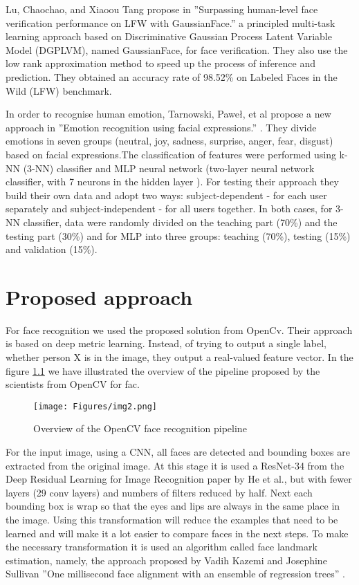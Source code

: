 \documentclass[runningheads,a4paper,11pt]{report}
\begin{document}
Lu, Chaochao, and Xiaoou Tang 	propose in ''Surpassing human-level face verification performance on LFW with GaussianFace.'' \cite{lu2015surpassing}  a principled multi-task learning approach based on Discriminative Gaussian Process Latent Variable Model (DGPLVM), named GaussianFace, for face verification. They also use the low rank approximation method to speed up the process of inference and prediction. They obtained an accuracy rate of 98.52\% on  Labeled Faces in the Wild (LFW) benchmark.

In order to recognise human emotion,  Tarnowski, Paweł, et al propose a new approach in ''Emotion recognition using facial expressions.'' \cite{tarnowski2017emotion} . They divide emotions in seven groups  (neutral, joy, sadness, surprise, anger, fear, disgust) based on facial expressions.The classification of features were performed using k-NN (3-NN) classifier and MLP neural network (two-layer neural network classifier, with 7 neurons in the hidden layer ). For testing their approach they build their own data and adopt two ways:  subject-dependent - for each user separately and  subject-independent - for all users together. In both cases, for 3-NN classifier, data were randomly divided on the teaching part (70\%) and the testing part (30\%) and for MLP into three groups: teaching (70\%), testing (15\%) and validation (15\%).


\chapter{Proposed approach}
\label{chapter:proposedApproach}

For face recognition we used the proposed solution from OpenCv. Their approach is based on deep metric learning. Instead, of trying to output a single label, whether person X is in the image, they output a real-valued feature vector. In the figure \ref{img2} we have illustrated the overview of the pipeline proposed by the scientists from OpenCV for fac.

 \begin{figure}[!htb]
    \centering
    \texttt{[image: Figures/img2.png]}
    \caption{Overview of the OpenCV face recognition pipeline}
    \label{img2}
\end{figure}

For the input image, using a CNN, all faces are detected and bounding boxes are extracted from the original image. At this stage it is used a ResNet-34 from the Deep Residual Learning for Image Recognition \cite{he2016deep} paper by He et al., but with fewer layers (29 conv layers) and numbers of filters reduced by half. Next each bounding box is wrap so that the eyes and lips are always in the same place in the image. Using this transformation will reduce the examples that need to be learned and will make it a lot easier to compare faces in the next steps.
To make the necessary transformation it is used an algorithm called face landmark estimation, namely, the approach proposed by Vadih Kazemi and Josephine Sullivan ''One millisecond face alignment with an ensemble of regression trees'' \cite{kazemi2014one}.
\end{document}
